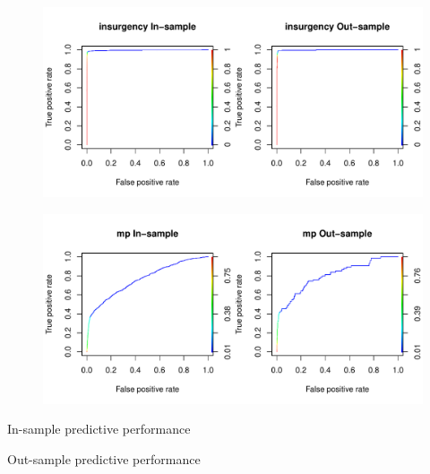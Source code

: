 \documentclass[12pt]{article}
\begin{document}
\begin{figure}
\includegraphics[width=\textwidth]{fig/roc_insurgency}
\end{figure}

\begin{figure}
\includegraphics[width=\textwidth]{fig/roc_mp}
\end{figure}

\begin{table}
\centering

\caption{In-sample predictive performance}
\end{table}

\begin{table}
\centering

\caption{Out-sample predictive performance}
\end{table}
\end{document}
